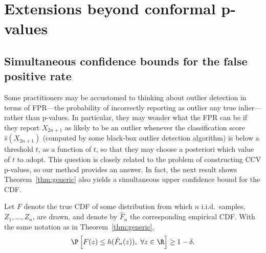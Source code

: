 

\section{Extensions beyond conformal p-values} \label{sec:extensions}

\subsection{Simultaneous confidence bounds for the false positive rate}

Some practitioners may be accustomed to thinking about outlier detection in terms of FPR---the probability of incorrectly reporting as outlier any true inlier---rather than p-values.
In particular, they may wonder what the FPR can be if they report $X_{2n+1}$ as likely to be an outlier whenever the classification score $\hat{s}(X_{2n+1})$ (computed by some black-box outlier detection algorithm) is below a threshold $t$, as a function of $t$, so that they may choose a posteriori which value of $t$ to adopt.
This question is closely related to the problem of constructing CCV p-values, so our method provides an answer.
In fact, the next result shows Theorem~\ref{thm:generic} also yields a simultaneous upper confidence bound for the CDF.
\begin{prop} \label{prop:ucb-fpr}
Let $F$ denote the true CDF of some distribution from which $n$ i.i.d.~samples, $Z_1, \ldots, Z_n$, are drawn, and denote by $\hat{F}_n$ the corresponding empirical CDF.
With the same notation as in Theorem~\ref{thm:generic},
\begin{equation}\label{eq:uniform_CDF}
\P\left[F(z)\le h(\hat{F}_{n}(z)), \,\,\forall z \in \R\right]\ge 1 - \delta.
\end{equation}
\end{prop}

